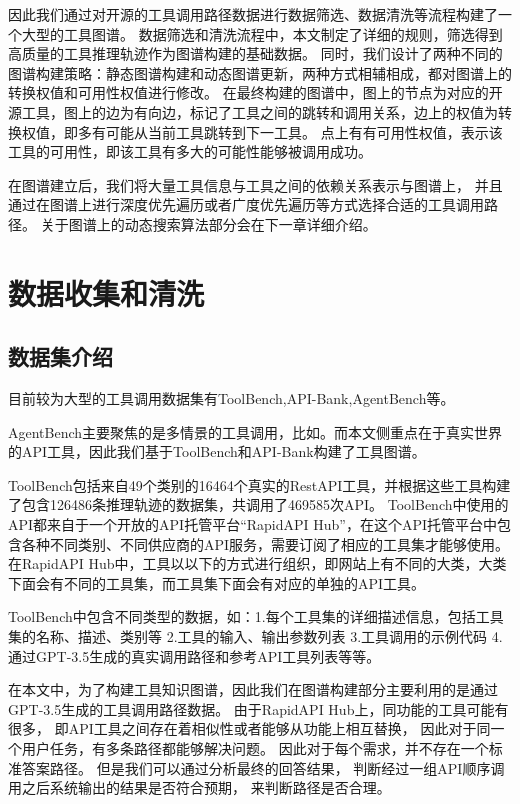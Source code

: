 因此我们通过对开源的工具调用路径数据进行数据筛选、数据清洗等流程构建了一个大型的工具图谱。
数据筛选和清洗流程中，本文制定了详细的规则，筛选得到高质量的工具推理轨迹作为图谱构建的基础数据。
同时，我们设计了两种不同的图谱构建策略：静态图谱构建和动态图谱更新，两种方式相辅相成，都对图谱上的转换权值和可用性权值进行修改。
在最终构建的图谱中，图上的节点为对应的开源工具，图上的边为有向边，标记了工具之间的跳转和调用关系，边上的权值为转换权值，即多有可能从当前工具跳转到下一工具。
点上有有可用性权值，表示该工具的可用性，即该工具有多大的可能性能够被调用成功。

在图谱建立后，我们将大量工具信息与工具之间的依赖关系表示与图谱上，
并且通过在图谱上进行深度优先遍历或者广度优先遍历等方式选择合适的工具调用路径。
关于图谱上的动态搜索算法部分会在下一章详细介绍。

\section{数据收集和清洗}

\subsection{数据集介绍}

目前较为大型的工具调用数据集有ToolBench\cite{Qin2023},API-Bank\cite{Li2023c},AgentBench\cite{Liu2023b}等。

AgentBench主要聚焦的是多情景的工具调用，比如。而本文侧重点在于真实世界的API工具，因此我们基于ToolBench和API-Bank构建了工具图谱。

ToolBench包括来自49个类别的16464个真实的RestAPI工具，并根据这些工具构建了包含126486条推理轨迹的数据集，共调用了469585次API。
ToolBench中使用的API都来自于一个开放的API托管平台“RapidAPI Hub”，在这个API托管平台中包含各种不同类别、不同供应商的API服务，需要订阅了相应的工具集才能够使用。在RapidAPI Hub中，工具以以下的方式进行组织，即网站上有不同的大类，大类下面会有不同的工具集，而工具集下面会有对应的单独的API工具。

ToolBench中包含不同类型的数据，如：1.每个工具集的详细描述信息，包括工具集的名称、描述、类别等 2.工具的输入、输出参数列表 3.工具调用的示例代码 4.通过GPT-3.5生成的真实调用路径和参考API工具列表等等。

在本文中，为了构建工具知识图谱，因此我们在图谱构建部分主要利用的是通过GPT-3.5生成的工具调用路径数据。
由于RapidAPI Hub上，同功能的工具可能有很多，
即API工具之间存在着相似性或者能够从功能上相互替换，
因此对于同一个用户任务，有多条路径都能够解决问题。
因此对于每个需求，并不存在一个标准答案路径。
但是我们可以通过分析最终的回答结果，
判断经过一组API顺序调用之后系统输出的结果是否符合预期，
来判断路径是否合理。

